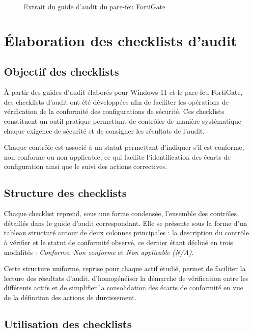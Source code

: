 \begin{figure}[htbp]
\centering
{}
\caption{Extrait du guide d'audit du pare-feu FortiGate}
\label{fig:guide-forti}
\end{figure}

\section{Élaboration des checklists d'audit}

\subsection{Objectif des checklists}

À partir des guides d'audit élaborés pour Windows 11 et le pare-feu FortiGate, des checklists d'audit ont été développées afin de faciliter les opérations de vérification de la conformité des configurations de sécurité. Ces checklists constituent un outil pratique permettant de contrôler de manière systématique chaque exigence de sécurité et de consigner les résultats de l'audit.

Chaque contrôle est associé à un statut permettant d'indiquer s'il est conforme, non conforme ou non applicable, ce qui facilite l'identification des écarts de configuration ainsi que le suivi des actions correctives.

\subsection{Structure des checklists}

Chaque checklist reprend, sous une forme condensée, l'ensemble des contrôles détaillés dans le guide d'audit correspondant. Elle se présente sous la forme d'un tableau structuré autour de deux colonnes principales : la description du contrôle à vérifier et le statut de conformité observé, ce dernier étant décliné en trois modalités : \emph{Conforme}, \emph{Non conforme} et \emph{Non applicable (N/A)}.

Cette structure uniforme, reprise pour chaque actif étudié, permet de faciliter la lecture des résultats d'audit, d'homogénéiser la démarche de vérification entre les différents actifs et de simplifier la consolidation des écarts de conformité en vue de la définition des actions de durcissement.

\subsection{Utilisation des checklists}

